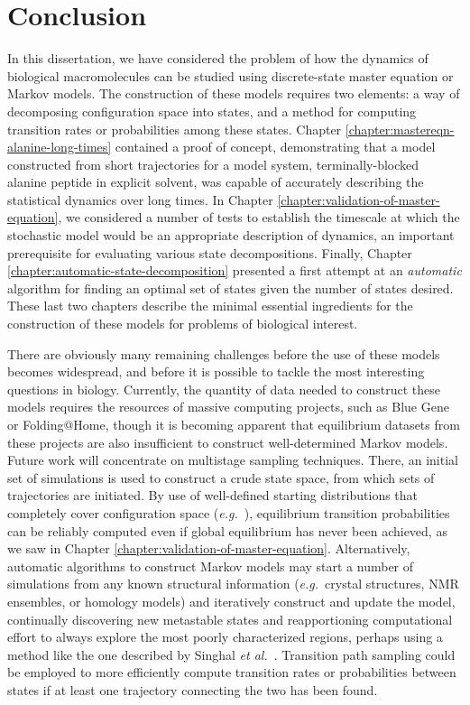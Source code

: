 \chapter{Conclusion}
\label{chapter:conclusion}

In this dissertation, we have considered the problem of how the dynamics of biological macromolecules can be studied using discrete-state master equation or Markov models.
The construction of these models requires two elements: a way of decomposing configuration space into states, and a method for computing transition rates or probabilities among these states.
Chapter \ref{chapter:mastereqn-alanine-long-times} contained a proof of concept, demonstrating that a model constructed from short trajectories for a model system, terminally-blocked alanine peptide in explicit solvent, was capable of accurately describing the statistical dynamics over long times.
In Chapter \ref{chapter:validation-of-master-equation}, we considered a number of tests to establish the timescale at which the stochastic model would be an appropriate description of dynamics, an important prerequisite for evaluating various state decompositions.
Finally, Chapter \ref{chapter:automatic-state-decomposition} presented a first attempt at an \emph{automatic} algorithm for finding an optimal set of states given the number of states desired.
These last two chapters describe the minimal essential ingredients for the construction of these models for problems of biological interest.

There are obviously many remaining challenges before the use of these models becomes widespread, and before it is possible to tackle the most interesting questions in biology.
Currently, the quantity of data needed to construct these models requires the resources of massive computing projects, such as Blue Gene or Folding@Home, though it is becoming apparent that equilibrium datasets from these projects are also insufficient to construct well-determined Markov models.
Future work will concentrate on multistage sampling techniques.
There, an initial set of simulations is used to construct a crude state space, from which sets of trajectories are initiated.
By use of well-defined starting distributions that completely cover configuration space (\emph{e.g.}\ \cite{swope:2004a,weber-thesis:2006a,kube:2006a}), equilibrium transition probabilities can be reliably computed even if global equilibrium has never been achieved, as we saw in Chapter \ref{chapter:validation-of-master-equation}.
Alternatively, automatic algorithms to construct Markov models may start a number of simulations from any known structural information (\emph{e.g.}\ crystal structures, NMR ensembles, or homology models) and iteratively construct and update the model, continually discovering new metastable states and reapportioning computational effort to always explore the most poorly characterized regions, perhaps using a method like the one described by Singhal \emph{et al.}\ \cite{singhal:2005a}.
Transition path sampling \cite{dellago:1998b,bolhuis:2002a} could be employed to more efficiently compute transition rates or probabilities between states if at least one trajectory connecting the two has been found.

